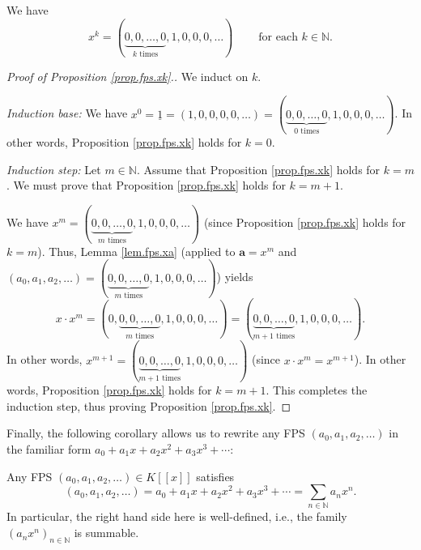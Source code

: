 \begin{proposition}
\label{prop.fps.xk}We have%
\[
x^{k}=\left(  \underbrace{0,0,\ldots,0}_{k\text{ times}},1,0,0,0,\ldots
\right)  \ \ \ \ \ \ \ \ \ \ \text{for each }k\in\mathbb{N}.
\]

\end{proposition}

\begin{proof}
[Proof of Proposition \ref{prop.fps.xk}.]We induct on $k$.

\textit{Induction base:} We have $x^{0}=\underline{1}=\left(  1,0,0,0,0,\ldots
\right)  =\left(  \underbrace{0,0,\ldots,0}_{0\text{ times}},1,0,0,0,\ldots
\right)  $. In other words, Proposition \ref{prop.fps.xk} holds for $k=0$.

\textit{Induction step:} Let $m\in\mathbb{N}$. Assume that Proposition
\ref{prop.fps.xk} holds for $k=m$. We must prove that Proposition
\ref{prop.fps.xk} holds for $k=m+1$.

We have $x^{m}=\left(  \underbrace{0,0,\ldots,0}_{m\text{ times}%
},1,0,0,0,\ldots\right)  $ (since Proposition \ref{prop.fps.xk} holds for
$k=m$). Thus, Lemma \ref{lem.fps.xa} (applied to $\mathbf{a}=x^{m}$ and
\newline$\left(  a_{0},a_{1},a_{2},\ldots\right)  =\left(
\underbrace{0,0,\ldots,0}_{m\text{ times}},1,0,0,0,\ldots\right)  $) yields%
\[
x\cdot x^{m}=\left(  0,\underbrace{0,0,\ldots,0}_{m\text{ times}%
},1,0,0,0,\ldots\right)  =\left(  \underbrace{0,0,\ldots,0}_{m+1\text{ times}%
},1,0,0,0,\ldots\right)  .
\]
In other words, $x^{m+1}=\left(  \underbrace{0,0,\ldots,0}_{m+1\text{ times}%
},1,0,0,0,\ldots\right)  $ (since $x\cdot x^{m}=x^{m+1}$). In other words,
Proposition \ref{prop.fps.xk} holds for $k=m+1$. This completes the induction
step, thus proving Proposition \ref{prop.fps.xk}.
\end{proof}

Finally, the following corollary allows us to rewrite any FPS $\left(
a_{0},a_{1},a_{2},\ldots\right)  $ in the familiar form $a_{0}+a_{1}%
x+a_{2}x^{2}+a_{3}x^{3}+\cdots$:

\begin{corollary}
\label{cor.fps.sumakxk}Any FPS $\left(  a_{0},a_{1},a_{2},\ldots\right)  \in
K\left[  \left[  x\right]  \right]  $ satisfies%
\[
\left(  a_{0},a_{1},a_{2},\ldots\right)  =a_{0}+a_{1}x+a_{2}x^{2}+a_{3}%
x^{3}+\cdots=\sum_{n\in\mathbb{N}}a_{n}x^{n}.
\]
In particular, the right hand side here is well-defined, i.e., the family
$\left(  a_{n}x^{n}\right)  _{n\in\mathbb{N}}$ is summable.
\end{corollary}

